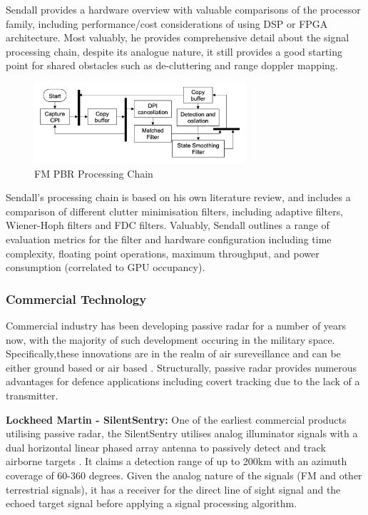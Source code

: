 \documentclass[12pt,a4paper]{article}
\begin{document}
\par \vspace{0.5cm} 
\noindent Sendall provides a hardware overview with valuable comparisons of the processor family, including performance/cost considerations of using DSP or FPGA architecture. Most valuably, he provides comprehensive detail about the signal processing chain, despite its analogue nature, it still provides a good starting point for shared obstacles such as de-cluttering and range doppler mapping.

\begin{figure}[htbp]
    \centering
    \includegraphics[width=0.7\textwidth]{filterChain.png}
    \caption{FM PBR Processing Chain \cite{FMlowCost}}
    \label{fig:fmChain}
\end{figure}

\par \vspace{0.5cm} 
\noindent Sendall's processing chain is based on his own literature review, and includes a comparison of different clutter minimisation filters, including adaptive filters, Wiener-Hoph filters and FDC filters. Valuably, Sendall outlines a range of evaluation metrics for the filter and hardware configuration including time complexity, floating point operations, maximum throughput, and power consumption (correlated to GPU occupancy).

\subsubsection{Commercial Technology}
Commercial industry has been developing passive radar for a number of years now, with the majority of such development occuring in the military space. Specifically,these innovations are in the realm of air sureveillance and can be either ground based or air based \cite{FundamentalsPassiveRadar}. Structurally, passive radar provides numerous advantages for defence applications including covert tracking due to the lack of a transmitter.
\par \vspace{0.5cm} 
\noindent \textbf{Lockheed Martin - SilentSentry:} One of the earliest commercial products utilising passive radar, the SilentSentry utilises analog illuminator signals with a dual horizontal linear phased array antenna to passively detect and track airborne targets \cite{DTSO2009}. It claims a detection range of up to 200km with an azimuth coverage of 60-360 degrees. Given the analog nature of the signals (FM and other terrestrial signals), it has a receiver for the direct line of sight signal and the echoed target signal before applying a signal processing algorithm.
\end{document}
